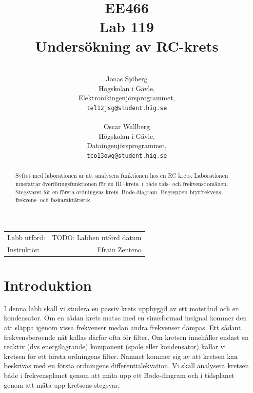 \documentclass[11pt,a4paper]{article}
\title{EE466 \\ Lab 119 \\ Undersökning av RC-krets}
\author{\\
  Jonas Sjöberg\\
  Högskolan i Gävle,\\
  Elektronikingenjörsprogrammet,\\
  \texttt{tel12jsg@student.hig.se}\\
  \\
  Oscar Wallberg\\
  Högskolan i Gävle,\\
  Dataingenjörsprogrammet,\\
  \texttt{tco13owg@student.hig.se}\\}
\date{}
\begin{document}
\maketitle

\begin{center}
    \begin{tabular}{l r}
        Labb utförd: & TODO: Labben utförd datum \\
        Instruktör: & Efrain Zenteno
    \end{tabular}
\end{center}

\begin{abstract}
    Syftet med laborationen är att analysera funktionen hos en RC krets.
    Laborationen innefattar överföringsfunktionen för en RC-krets, i både tids-
    och frekvensdomänen. Stegsvaret för en första ordningens krets. Bode-diagram.
    Begreppen brytfrekvens, frekvens- och faskaraktäristik.
\end{abstract}

\newpage

{
    \setcounter{tocdepth}{3}
    \tableofcontents
}

\newpage

\section{Introduktion}\label{setup}
I denna labb skall vi studera en passiv krets uppbyggd av ett motstånd och en
kondensator. Om en sådan krets matas med en sinusformad insignal kommer den att
släppa igenom vissa frekvenser medan andra frekvenser dämpas. Ett sådant
frekvensberoende nät kallas därför ofta för filter. Om kretsen innehåller
endast en reaktiv (dvs energilagrande) komponent (spole eller kondensator)
kallar vi kretsen för ett första ordningens filter. Namnet kommer sig av att
kretsen kan beskrivas med en första ordningens differentialekvation.
Vi skall analysera kretsen både i frekvensplanet genom att mäta upp ett
Bode-diagram och i tidsplanet genom att mäta upp kretsens stegsvar.
\end{document}
